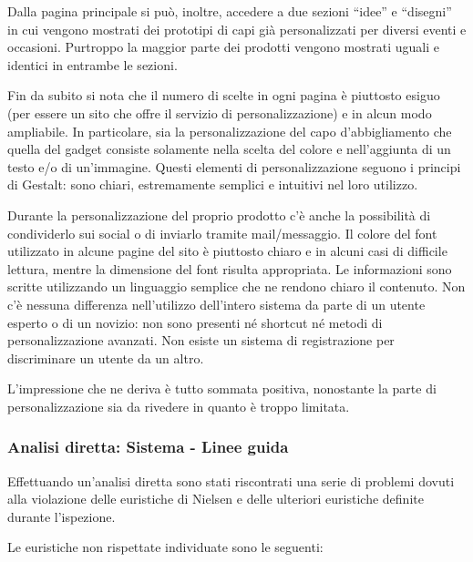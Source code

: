 \documentclass[12pt,italian,]{report}
\begin{document}
Dalla pagina principale si può, inoltre, accedere a due sezioni ``idee''
e ``disegni'' in cui vengono mostrati dei prototipi di capi già
personalizzati per diversi eventi e occasioni. Purtroppo la maggior
parte dei prodotti vengono mostrati uguali e identici in entrambe le
sezioni.

Fin da subito si nota che il numero di scelte in ogni pagina è piuttosto
esiguo (per essere un sito che offre il servizio di personalizzazione) e
in alcun modo ampliabile. In particolare, sia la personalizzazione del
capo d'abbigliamento che quella del gadget consiste solamente nella
scelta del colore e nell'aggiunta di un testo e/o di un'immagine. Questi
elementi di personalizzazione seguono i principi di Gestalt: sono
chiari, estremamente semplici e intuitivi nel loro utilizzo.

Durante la personalizzazione del proprio prodotto c'è anche la
possibilità di condividerlo sui social o di inviarlo tramite
mail/messaggio. Il colore del font utilizzato in alcune pagine del sito
è piuttosto chiaro e in alcuni casi di difficile lettura, mentre la
dimensione del font risulta appropriata. Le informazioni sono scritte
utilizzando un linguaggio semplice che ne rendono chiaro il contenuto.
Non c'è nessuna differenza nell'utilizzo dell'intero sistema da parte di
un utente esperto o di un novizio: non sono presenti né shortcut né
metodi di personalizzazione avanzati. Non esiste un sistema di
registrazione per discriminare un utente da un altro.

L'impressione che ne deriva è tutto sommata positiva, nonostante la
parte di personalizzazione sia da rivedere in quanto è troppo limitata.

\hypertarget{analisi-diretta-sistema---linee-guida}{%
\subsubsection{Analisi diretta: Sistema - Linee
guida}\label{analisi-diretta-sistema---linee-guida}}

Effettuando un'analisi diretta sono stati riscontrati una serie di
problemi dovuti alla violazione delle euristiche di Nielsen e delle
ulteriori euristiche definite durante l'ispezione.

Le euristiche non rispettate individuate sono le seguenti:
\end{document}
